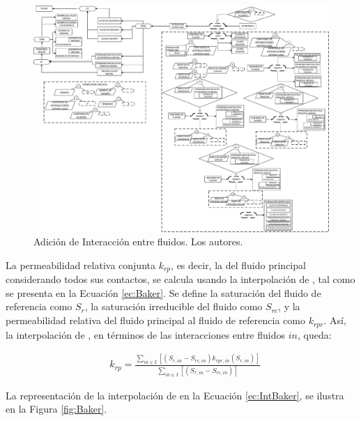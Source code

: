 \begin{figure}[h]
	\centering%
	\includegraphics[width=0.9\linewidth]{Fig/Interphase.pdf}%
	\caption[Adición de Interacción entre fluidos.]{Adición de Interacción entre fluidos. Los autores.} \label{fig:Contact}
\end{figure}

La permeabilidad relativa conjunta $k_{rp}$, es decir, la del fluido principal considerando todos sus contactos, se calcula usando la interpolación de \cite{Baker1988}, tal como se presenta en la Ecuación \ref{ec:Baker}. Se define la saturación del fluido de referencia como $S_{r}$, la saturación irreducible del fluido como $S_{rc}$, y la permeabilidad relativa del fluido principal al fluido de referencia como $k_{rpr}$. Así, la interpolación de \cite{Baker1988}, en términos de las interacciones entre fluidos $in$, queda:

\begin{align}
	\label{ec:IntBaker}&k_{rp} = \frac{\sum_{in \in I}\left[\left(S_{r,in} - S_{rc,in}\right)k_{rpr,in}\left(S_{r,in}\right)\right]}{\sum_{in \in I}\left[\left(S_{r,in} - S_{rc,in}\right)\right]}
\end{align}

La representación de la interpolación de \cite{Baker1988} en la Ecuación \ref{ec:IntBaker}, se ilustra en la Figura \ref{fig:Baker}.

